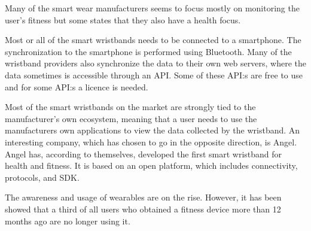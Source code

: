 \documentclass{cslthse-msc}
\begin{document}
Many of the smart wear manufacturers seems to focus mostly on monitoring the user’s fitness but some states that they also have a health focus.

Most or all of the smart wristbands needs to be connected to a smartphone. The synchronization to the smartphone is performed using Bluetooth. Many of the wristband providers also synchronize the data to their own web servers, where the data sometimes is accessible through an API. Some of these API:s are free to use and for some API:s a licence is needed.%

Most of the smart wristbands on the market are strongly tied to the manufacturer’s own ecosystem, meaning that a user needs to use the manufacturers own applications to view the data collected by the wristband. An interesting company, which has chosen to go in the opposite direction, is Angel. Angel has, according to themselves\cite{angelfaq}, developed the first smart wristband for health and fitness. It is based on an open platform, which includes connectivity, protocols, and SDK. 

The awareness and usage of wearables are on the rise. However, it has been showed that a third of all users who obtained a fitness device more than 12 months ago are no longer using it.

\end{document}
